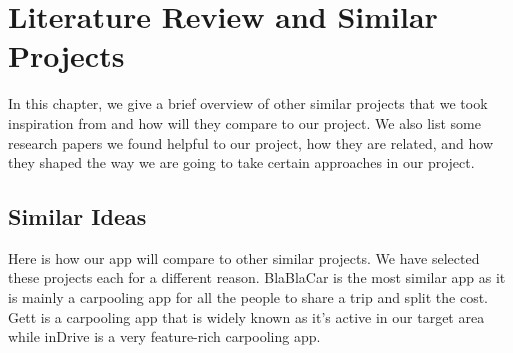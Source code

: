 \documentclass[a4paper, 12pt]{report} %
\begin{document}

    \pagebreak
    
    \section{Literature Review and Similar Projects}
        In this chapter, we give a brief overview of other similar projects that we took inspiration from and how will they compare to our project. We also list some research papers we found helpful to our project, how they are related, and how they shaped the way we are going to take certain approaches in our project.
        \subsection{Similar Ideas}
            Here is how our app will compare to other similar projects. We have selected these projects each for a different reason. BlaBlaCar is the most similar app as it is mainly a carpooling app for all the people to share a trip and split the cost. Gett is a carpooling app that is widely known as it's active in our target area while inDrive is a very feature-rich carpooling app.
\end{document}
